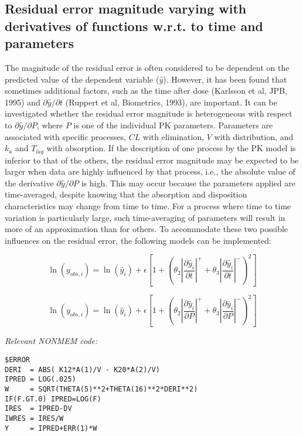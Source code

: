 \documentclass[a4paper,11pt]{article}
\begin{document}
\subsection{Residual error magnitude varying with derivatives of functions w.r.t. to time and parameters}
The magnitude of the residual error is often considered to be
dependent on the predicted value of the dependent variable
($\hat{y}$). However, it has been found that sometimes additional
factors, such as the time after dose (Karlsson et al, JPB, 1995) and
$\partial \hat{y} / \partial t$ (Ruppert et al, Biometrics, 1993), are
important. It can be investigated whether the residual error magnitude
is heterogeneous with respect to $\partial \hat{y}/\partial{P}$, where
$P$ is one of the individual PK parameters. Parameters are associated
with specific processes, $CL$ with elimination, $V$ with distribution,
and $k_a$ and $T_{lag}$ with absorption. If the description of one
process by the PK model is inferior to that of the others, the
residual error magnitude may be expected to be larger when data are
highly influenced by that process, i.e., the absolute value of the
derivative $\partial \hat{y}/\partial{P}$ is high. This may occur
because the parameters applied are time-averaged, despite knowing that
the absorption and disposition characteristics may change from time to
time. For a process where time to time variation is particularly
large, such time-averaging of parameters will result in more of an
approximation than for others. To accommodate these two possible
influences on the residual error, the following models can be
implemented:

\vspace{5pt}

\begin{equation}
\ln(y_{obs,i}) = \ln(\hat{y}_i) + \epsilon \left[1+\left(\theta_2
    \left| \frac{\partial \hat{y}_i}{\partial t} \right|^+ + \theta_3
    \left| \frac{\partial \hat{y}_i}{\partial t} \right|^- \right)^2 \right] 
\end{equation}

\begin{equation}
\ln(y_{obs,i}) = \ln(\hat{y}_i) + \epsilon \left[1+\left(\theta_2
    \left| \frac{\partial \hat{y}_i}{\partial P} \right|^+ + \theta_3
    \left| \frac{\partial \hat{y}_i}{\partial P} \right|^- \right)^2 \right]
\end{equation}

\vspace{10pt}

\noindent \emph{Relevant NONMEM code:}
\begin{lstlisting}
$ERROR
DERI  = ABS( K12*A(1)/V - K20*A(2)/V)
IPRED = LOG(.025)
W     = SQRT(THETA(5)**2+THETA(16)**2*DERI**2)
IF(F.GT.0) IPRED=LOG(F)
IRES  = IPRED-DV
IWRES = IRES/W
Y     = IPRED+ERR(1)*W
\end{lstlisting}
\end{document}
